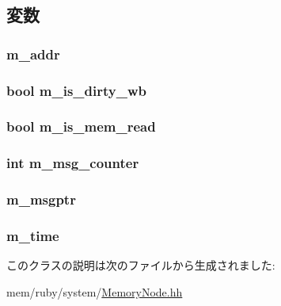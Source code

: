 \subsection{変数}
\hypertarget{classMemoryNode_a87dedd4d12dd06f03efa1a9c2301bfc6}{
\subsubsection[{m\_\-addr}]{ {\bf m\_\-addr}}}
\label{classMemoryNode_a87dedd4d12dd06f03efa1a9c2301bfc6}
\hypertarget{classMemoryNode_ac2c60a723b1878520874acc283e013a5}{
\subsubsection[{m\_\-is\_\-dirty\_\-wb}]{\setlength{\rightskip}{0pt plus 5cm}bool {\bf m\_\-is\_\-dirty\_\-wb}}}
\label{classMemoryNode_ac2c60a723b1878520874acc283e013a5}
\hypertarget{classMemoryNode_a364a76c8c3f0d9225ec87b42a36b9264}{
\subsubsection[{m\_\-is\_\-mem\_\-read}]{\setlength{\rightskip}{0pt plus 5cm}bool {\bf m\_\-is\_\-mem\_\-read}}}
\label{classMemoryNode_a364a76c8c3f0d9225ec87b42a36b9264}
\hypertarget{classMemoryNode_acfac131e63985feff04ed11cbaf0d221}{
\subsubsection[{m\_\-msg\_\-counter}]{\setlength{\rightskip}{0pt plus 5cm}int {\bf m\_\-msg\_\-counter}}}
\label{classMemoryNode_acfac131e63985feff04ed11cbaf0d221}
\hypertarget{classMemoryNode_a0190ebd96c557881596457a02c2f8743}{
\subsubsection[{m\_\-msgptr}]{ {\bf m\_\-msgptr}}}
\label{classMemoryNode_a0190ebd96c557881596457a02c2f8743}
\hypertarget{classMemoryNode_ac39faf9ea84c2e7518ba2f960c661636}{
\subsubsection[{m\_\-time}]{ {\bf m\_\-time}}}
\label{classMemoryNode_ac39faf9ea84c2e7518ba2f960c661636}


このクラスの説明は次のファイルから生成されました:\begin{DoxyCompactItemize}
\item 
mem/ruby/system/\hyperlink{MemoryNode_8hh}{MemoryNode.hh}\end{DoxyCompactItemize}
